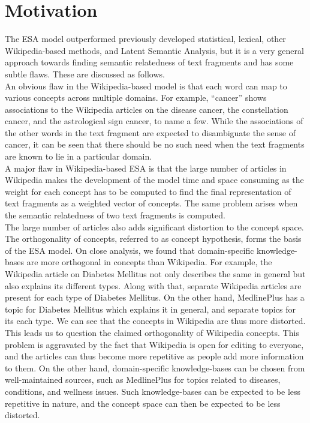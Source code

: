 \documentclass[journal,transmag]{IEEEtran}
\begin{document}
\section{\textbf{Motivation}}
The ESA model outperformed previously developed statistical, lexical, other Wikipedia-based methods, and Latent Semantic Analysis, but it is a very general approach towards finding semantic relatedness of text fragments and has some subtle flaws. These are discussed as follows.\\
An obvious flaw in the Wikipedia-based model is that each word can map to various concepts across multiple domains. For example, ``cancer'' shows associations to the Wikipedia articles on the disease cancer, the constellation cancer, and the astrological sign cancer, to name a few. While the associations of the other words in the text fragment are expected to disambiguate the sense of cancer, it can be seen that there should be no such need when the text fragments are known to lie in a particular domain.\\
A major flaw in Wikipedia-based ESA is that the large number of articles in Wikipedia makes the development of the model time and space consuming as the weight for each concept has to be computed to find the final representation of text fragments as a weighted vector of concepts. The same problem arises when the semantic relatedness of two text fragments is computed.\\
The large number of articles also adds significant distortion to the concept space. The orthogonality of concepts, referred to as concept hypothesis, forms the basis of the ESA model. On close analysis, we found that domain-specific knowledge-bases are more orthogonal in concepts than Wikipedia. For example, the Wikipedia article on Diabetes Mellitus not only describes the same in general but also explains its different types. Along with that, separate Wikipedia articles are present for each type of Diabetes Mellitus. On the other hand, MedlinePlus has a topic for Diabetes Mellitus which explains it in general, and separate topics for its each type. We can see that the concepts in Wikipedia are thus more distorted. This leads us to question the claimed orthogonality of Wikipedia concepts. This problem is aggravated by the fact that Wikipedia is open for editing to everyone, and the articles can thus become more repetitive as people add more information to them. On the other hand, domain-specific knowledge-bases can be chosen from well-maintained sources, such as MedlinePlus for topics related to diseases, conditions, and wellness issues. Such knowledge-bases can be expected to be less repetitive in nature, and the concept space can then be expected to be less distorted.\\
\end{document}
